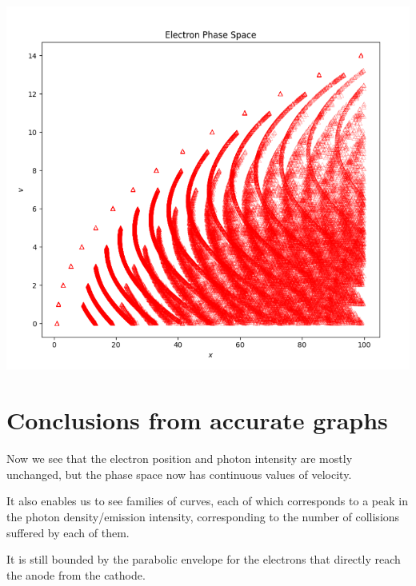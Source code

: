 \documentclass[12pt]{article}
\begin{document}
\begin{center}    
    \includegraphics[width=\textwidth]{images/fig2_acc_1.png}
\end{center}
\pagebreak
\section{Conclusions from accurate graphs}
Now we see that the electron position and photon intensity are mostly unchanged, but the phase space now has continuous values of velocity. 

It also enables us to see families of curves, each of which corresponds to a peak in the photon density/emission intensity, corresponding to the number of collisions suffered by each of them.

It is still bounded by the parabolic envelope for the electrons that directly reach the anode from the cathode.
\end{document}
